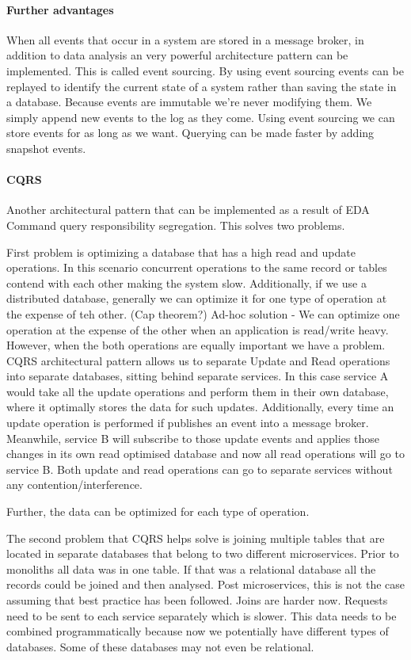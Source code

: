 \documentclass[a4paper, 11pt]{book}
\begin{document}
    \paragraph{Further advantages}
    When all events that occur in a system are stored in a message broker, in addition to data analysis an very powerful architecture pattern can be implemented.
    This is called event sourcing.
    By using event sourcing events can be replayed to identify the current state of a system rather than saving the state in a database.
    Because events are immutable we're never modifying them.
    We simply append new events to the log as they come.
    Using event sourcing we can store events for as long as we want.
    Querying can be made faster by adding snapshot events.

    \paragraph{CQRS}
    Another architectural pattern that can be implemented as a result of EDA
    Command query responsibility segregation.
    This solves two problems.

    First problem is optimizing a database that has a high read and update operations.
    In this scenario concurrent operations to the same record or tables contend with each other making the system slow.
    Additionally, if we use a distributed database, generally we can optimize it for one type of operation at the expense of teh other.
    (Cap theorem?)
    Ad-hoc solution - We can optimize one operation at the expense of the other when an application is read/write heavy.
    However, when the both operations are equally important we have a problem.
    CQRS architectural pattern allows us to separate Update and Read operations into separate databases, sitting behind separate services.
    In this case service A would take all the update operations and perform them in their own database, where it optimally stores the data for such updates.
    Additionally, every time an update operation is performed if publishes an event into a message broker.
    Meanwhile, service B will subscribe to those update events and applies those changes in its own read optimised database and now all read operations will go to service B.
    Both update and read operations can go to separate services without any contention/interference.

    Further, the data can be optimized for each type of operation.


    The second problem that CQRS helps solve is joining multiple tables that are located in separate databases that belong to two different microservices.
    Prior to monoliths all data was in one table.
    If that was a relational database all the records could be joined and then analysed.
    Post microservices, this is not the case assuming that best practice has been followed.
    Joins are harder now.
    Requests need to be sent to each service separately which is slower.
    This data needs to be combined programmatically because now we potentially have different types of databases.
    Some of these databases may not even be relational.
\end{document}
